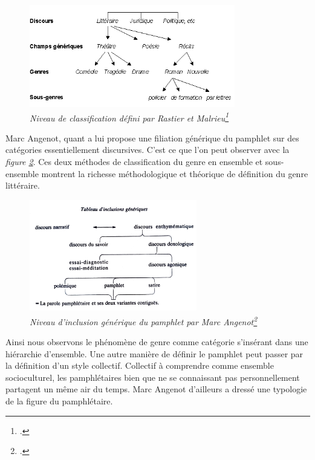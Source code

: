 \begin{figure}[H]
\centering %
\includegraphics[width=0.8\textwidth]{img/MR_Genres1_niveau-declassification.png}
\caption{\textit{Niveau de classification défini par Rastier et Malrieu\footcites{rastier_malrieu_nodate}}}
\label{fig:rastier_marlrieu_niveau_classification}
\end{figure}


Marc Angenot, quant a lui propose une filiation générique du pamphlet sur des catégories essentiellement discursives. C'est ce que l'on peut observer avec la \textit{figure \ref{fig:angenot_niveau_inclusion_générique}}. Ces deux méthodes de classification du genre en ensemble et sous-ensemble montrent la richesse méthodologique et théorique de définition du genre littéraire.
\begin{figure}[H]
\centering %
\includegraphics[width=0.65\textwidth]{img/fig_M_Angenot_tableau_inclusion_generique.png}
\caption{\textit{Niveau d'inclusion générique du pamphlet par Marc Angenot\footcites{angenot_parole_1982}}}
\label{fig:angenot_niveau_inclusion_générique}
\end{figure}
Ainsi nous observons le phénomène de genre comme catégorie s'insérant dans une hiérarchie d'ensemble. Une autre manière de définir le pamphlet peut passer par la définition d'un style collectif. Collectif à comprendre comme ensemble socioculturel, les pamphlétaires bien que ne se connaissant pas personnellement partagent un même air du temps. Marc Angenot d'ailleurs a dressé une typologie de la figure du pamphlétaire.

